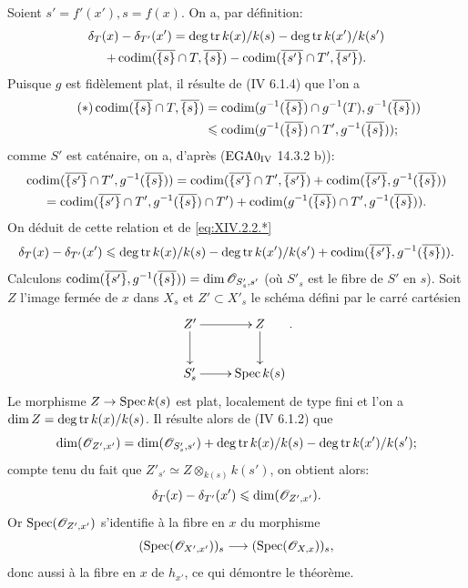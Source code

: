 Soient $s'=f'(x'), s=f(x)$. On a, par d\'efinition:
\begin{multline*}
\delta_T(x)-\delta_{T'}(x')=\operatorname{deg\,tr} k(x)/k(s)-\operatorname{deg\,tr} k(x')/k(s')\\
+\operatorname{codim}(\overline{\{s\}}\cap T, \overline{\{s\}})-\operatorname{codim}(\overline{\{s'\}}\cap T', \overline{\{s'\}}).
\end{multline*}
Puisque $g$ est fid\`element plat, il r\'esulte de (\EGA IV 6.1.4) que l'on a
\begin{align*} \label{eq:XIV.2.2.*} \tag{$*$}
\operatorname{codim}(\overline{\{s\}}\cap T, \overline{\{s\}})&=\operatorname{codim}(g^{-1}(\overline{\{s\}})\cap g^{-1}(T), g^{-1}(\overline{\{s\}}))\\&\leqslant\operatorname{codim}(g^{-1}(\overline{\{s\}})\cap T', g^{-1}(\overline{\{s\}}));
\end{align*}
comme $S'$ est cat\'enaire, on a, d'apr\`es ($\textup{EGA}\space 0_{\textup{IV}}$ 14.3.2 b)):
\begin{multline*}
\operatorname{codim}(\overline{\{s'\}}\cap T', g^{-1}(\overline{\{s\}}))= \operatorname{codim}(\overline{\{s'\}}\cap T', \overline{\{s'\}})+ \operatorname{codim}(\overline{\{s'\}}, g^{-1}(\overline{\{s\}}))\\
= \operatorname{codim}(\overline{\{s'\}}\cap T', g^{-1}(\overline{\{s\}})\cap T')+ \operatorname{codim}(g^{-1}(\overline{\{s\}})\cap T', g^{-1}(\overline{\{s\}})).
\end{multline*}
On d\'eduit de cette relation et de \eqref{eq:XIV.2.2.*}
$$
\delta_T(x)-\delta_{T'}(x')\leqslant\operatorname{deg\,tr} k(x)/k(s)-\operatorname{deg\,tr} k(x')/k(s')+\operatorname{codim}(\overline{\{s'\}}, g^{-1}(\overline{\{s\}})).
$$
Calculons $\operatorname{codim}(\overline{\{s'\}}, g^{-1}(\overline{\{s\}}))=\dim{\mathscr O}_{S'_s, s'}$ (o\`u $S'_s$ est le fibre de $S'$ en $s$). Soit $Z$ l'image ferm\'ee de $x$ dans $X_s$ et $Z'\subset X'_s$ le sch\'ema d\'efini par le carr\'e cart\'esien
$$
\xymatrix{Z^{\prime}\ar[r]\ar[d]&Z\ar[d]\\S^{\prime}_s\ar[r]&{\mathrm{Spec}\,k(s)}}.
$$
Le morphisme $Z\to \Spec k(s)$ est plat, localement de type fini et l'on a $\dim Z=\operatorname{deg\,tr} k(x)/k(s)$. Il r\'esulte alors de (\EGA IV 6.1.2) que
$$
\dim({\mathscr O}_{Z', x'})=\dim({\mathscr O}_{S'_s, s'})+\operatorname{deg\,tr} k(x)/k(s)-\operatorname{deg\,tr} k(x')/k(s');$$
compte tenu du fait que $Z'_{s'}\simeq Z\otimes_{k(s)}k(s')$, on obtient alors:
$$
\delta_T(x)-\delta_{T'}(x')\leqslant\dim({\mathscr O}_{Z', x'}).
$$
Or $\operatorname{Spec}({\mathscr O}_{Z', x'})$ s'identifie \`a la fibre en $x$ du morphisme
$$(\Spec(\Oo_{X', x'}))_s\to(\Spec(\Oo_{X, x}))_s,
$$
donc aussi \`a la fibre en $x$ de $h_{x'}$, ce qui d\'emontre le th\'eor\`eme.

